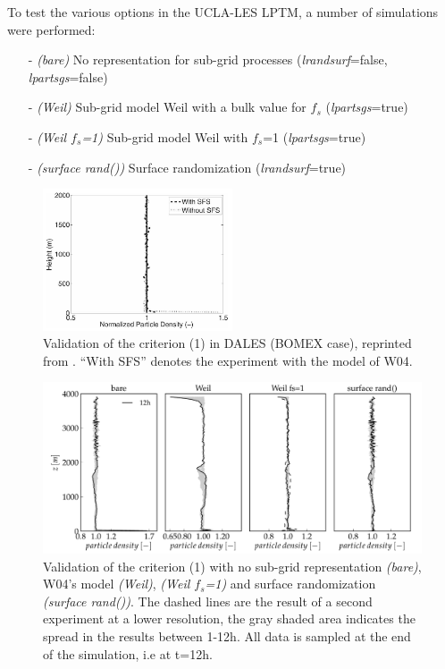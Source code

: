 \documentclass[twoside,a4paper]{report}
\begin{document}
To test the various options in the UCLA-LES LPTM, a number of simulations were performed:

\begin{itemize}
 \item[-] \textit{(bare)} No representation for sub-grid processes (\textit{lrandsurf}=false, \textit{lpartsgs}=false)
 \item[-] \textit{(Weil)} Sub-grid model Weil with a bulk value for $f_s$ (\textit{lpartsgs}=true)
 \item[-] \textit{(Weil $f_s$=1)} Sub-grid model Weil with $f_s$=1 (\textit{lpartsgs}=true)
 \item[-] \textit{(surface rand())} Surface randomization (\textit{lrandsurf}=true)
\end{itemize}

\begin{figure}[h]
  \begin{center}
    \includegraphics[width=0.5\textwidth]{figures_LPTM/pdensity_dales.png}
    \caption{Validation of the criterion (1) in DALES (BOMEX case), reprinted from \cite{heus2008}. ``With SFS'' denotes the experiment with the model of W04.}
    \label{fig:exa_subgrid_dales}       %
  \end{center}
\end{figure}

\begin{figure}[hb!]
  \begin{center}
    \includegraphics[width=1.0\textwidth]{figures_LPTM/rico_comp_subgrid.pdf}
    \caption{Validation of the criterion (1) with no sub-grid representation \textit{(bare)}, W04's model \textit{(Weil)}, \textit{(Weil $f_s$=1)} and surface randomization \textit{(surface rand())}. The dashed lines are the result of a second experiment at a lower resolution, the gray shaded area indicates the spread in the results between 1-12h. All data is sampled at the end of the simulation, i.e at t=12h.}
    \label{fig:exa_subgrid}       %
  \end{center}
\end{figure}
\end{document}
